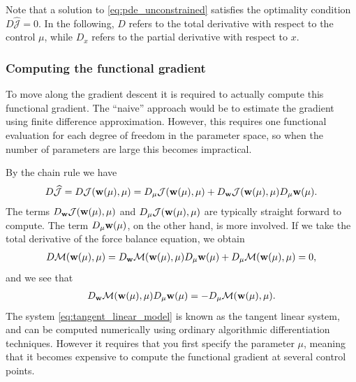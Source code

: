 Note that a solution to \eqref{eq:pde_unconstrained} satisfies the optimality
condition $D  \widehat{\mathcal{J}} = 0$. In the following, $D$ refers
to the total derivative with respect to the control $\mu$, while
$D_{x}$ refers to the partial derivative with respect to $x$.

\subsubsection{Computing the functional gradient} 
To move along the gradient descent it is required to actually
compute this functional gradient. The ``naive'' approach would be to
estimate the gradient using finite difference approximation. However,
this requires one functional evaluation for each degree of freedom in
the parameter space, so when the number of parameters are large this
becomes impractical.

By the chain rule we have
\begin{align*}
  D  \widehat{\mathcal{J}}  =  D  \mathcal{J}(\mathbf{w}(\mu), \mu) =
   D_{\mu}\mathcal{J}(\mathbf{w}(\mu), \mu) + D_{\mathbf{w}}\mathcal{J}(\mathbf{w}(\mu), \mu) D_{\mu}\mathbf{w}(\mu).
\end{align*}
The terms $D_{\mathbf{w}}\mathcal{J}(\mathbf{w}(\mu), \mu)$ and
$D_{\mu}\mathcal{J}(\mathbf{w}(\mu), \mu)$ are typically straight forward
to compute. The term $D_{\mu}\mathbf{w}(\mu)$, on the other hand, is more
involved.  If we take the total derivative of the force balance
equation, we obtain 
\begin{align*}
  D \mathcal{M}(\mathbf{w}(\mu), \mu) =
  D_{\mathbf{w}} \mathcal{M}(\mathbf{w}(\mu), \mu) D_{\mu}\mathbf{w}(\mu)
  +  D_{\mu} \mathcal{M}(\mathbf{w}(\mu), \mu)  = 0,
\end{align*}
and we see that
\begin{align}
  D_{\mathbf{w}} \mathcal{M}(\mathbf{w}(\mu), \mu)  D_{\mu}\mathbf{w}(\mu) = - D_{\mu} \mathcal{M}(\mathbf{w}(\mu), \mu).
  \label{eq:tangent_linear_model}
\end{align}
The system \eqref{eq:tangent_linear_model} is known as the tangent
linear system, and can be computed numerically using ordinary
algorithmic differentiation techniques. However it requires that you
first specify the parameter $\mu$, meaning that it becomes expensive to
compute the functional gradient at several control points. 

